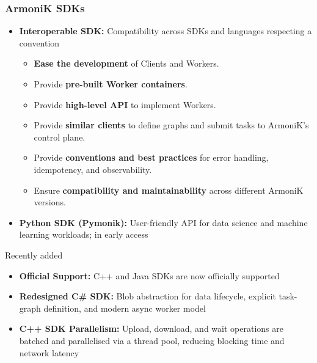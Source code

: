 \begin{frame}
	\frametitle{ArmoniK SDKs}
	\begin{itemize}
		\item \textbf{Interoperable SDK:} Compatibility across SDKs and languages respecting a convention
		      \begin{itemize}
			      \item \textbf{Ease the development} of Clients and Workers.
			      \item Provide \textbf{pre-built Worker containers}.
			      \item Provide \textbf{high-level API} to implement Workers.
			      \item Provide \textbf{similar clients} to define graphs and submit tasks to ArmoniK's control plane.
			      \item Provide \textbf{conventions and best practices} for error handling, idempotency, and observability.
			      \item Ensure \textbf{compatibility and maintainability} across different ArmoniK versions.
		      \end{itemize}
		\item \textbf{Python SDK (Pymonik):} User-friendly API for data science and machine learning workloads; in early access
	\end{itemize}
	\begin{block}{Recently added}
		\begin{itemize}
			\item \textbf{Official Support:} C++ and Java SDKs are now officially supported
			\item \textbf{Redesigned C\# SDK:} Blob abstraction for data lifecycle, explicit task-graph definition, and modern async worker model
			\item \textbf{C++ SDK Parallelism:} Upload, download, and wait operations are batched and parallelised via a thread pool, reducing blocking time and network latency
		\end{itemize}
	\end{block}
\end{frame}

